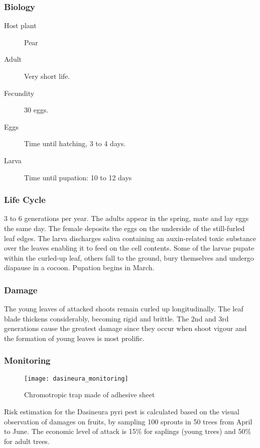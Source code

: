 \subsubsection{Biology}

\begin{description}
	\item [Host plant] Pear
	\item [Adult] Very short life.
	\item [Fecundity] 30 eggs.
	\item [Eggs] Time until hatching, 3 to 4 days.
	\item [Larva] Time until pupation: 10 to 12 days
\end{description}

\subsubsection{Life Cycle}

3 to 6 generations per year. The adults appear in the spring, mate and lay eggs the same day. The female deposits the eggs on the underside of the still-furled leaf edges. The larva discharges saliva containing an auxin-related toxic substance over the leaves enabling it to feed on the cell contents. Some of the larvae pupate within the curled-up leaf, others fall to the ground, bury themselves and undergo diapause in a cocoon. Pupation begins in March.

\subsubsection{Damage}

The young leaves of attacked shoots remain curled up longitudinally. The leaf blade thickens considerably, becoming rigid and brittle. The 2nd and 3rd generations cause the greatest damage since they occur when shoot vigour and the formation of young leaves is most prolific.

\subsubsection{Monitoring}

\begin{figure}[htbp]
  \centering
  \texttt{[image: dasineura\_monitoring]}
  \caption{Chromotropic trap made of adhesive sheet}
  \label{fig:dasineura_monitoring}
\end{figure}

Risk estimation for the Dasineura pyri pest is calculated based on the visual observation of damages on fruits, by sampling 100 sprouts in 50 trees from April to June. The economic level of attack is 15\% for saplings (young trees) and 50\% for adult trees.

